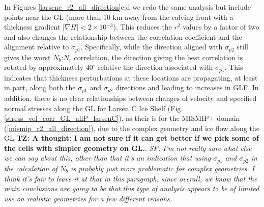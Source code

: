 \documentclass[tc, manuscript]{copernicus}
\begin{document}
In Figures \ref{larsenc_r2_all_direction}c,d we redo the same analysis but include points near the GL (more than 10 km away from the calving front with a thickness gradient $\left|\nabla H\right|< 2 \times$10$^{-3}$). This reduces the $r^2$ values by a factor of two and also changes the relationship between the correlation coefficient and the alignment relative to $\sigma_{p1}$. Specifically, while the direction aligned with $\sigma_{p2}$ still gives the worst $N_b$:$N_r$ correlation, the direction giving the best correlation is rotated by approximately $40^\circ$ relative the direction associated with $\sigma_{p1}$. This indicates that thickness perturbations at these locations are propagating, at least in part, along both the $\sigma_{p1}$ and $\sigma_{p2}$ directions and leading to increases in GLF. In addition, there is no clear relationships between changes of velocity and specified normal stresses along the GL for Larsen C Ice Shelf (Fig.  \ref{stress_vel_corr_GL_allP_larsenC}), as their is for the MISMIP+ domain (\ref{mismip_r2_all_direction}), due to the complex geometry and ice flow along the GL \textbf{TZ: A thought: I am not sure if it can get better if we pick some of the cells with simpler geometry on GL.}. \textit{SP: I'm not really sure what else we can say about this, other than that it's an indication that using $\sigma_{p1}$ and $\sigma_{p2}$ in the calculation of $N_b$ is probably just more problematic for complex geometries. I think it's fair to leave it at that in this paragraph, since overall, we know that the main conclusions are going to be that this type of analysis appears to be of limited use on realistic geometries for a few different reasons.} 
\end{document}
